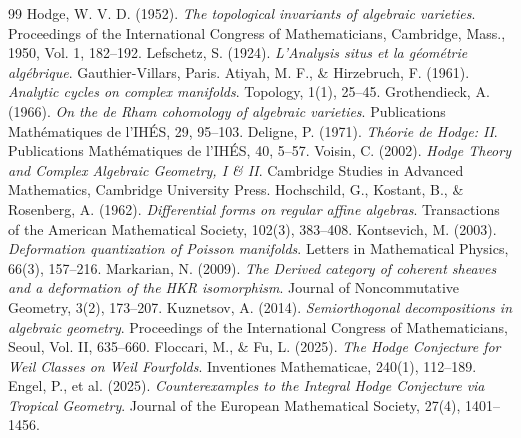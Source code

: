 \documentclass[11pt,a4paper]{article}
\theoremstyle{definition}
\begin{document}
\newpage
\begin{thebibliography}{99}
 Hodge, W. V. D. (1952). \textit{The topological invariants of algebraic varieties}. Proceedings of the International Congress of Mathematicians, Cambridge, Mass., 1950, Vol. 1, 182--192.
 Lefschetz, S. (1924). \textit{L'Analysis situs et la géométrie algébrique}. Gauthier-Villars, Paris.
 Atiyah, M. F., \& Hirzebruch, F. (1961). \textit{Analytic cycles on complex manifolds}. Topology, 1(1), 25--45.
 Grothendieck, A. (1966). \textit{On the de Rham cohomology of algebraic varieties}. Publications Mathématiques de l'IHÉS, 29, 95--103.
 Deligne, P. (1971). \textit{Théorie de Hodge: II}. Publications Mathématiques de l'IHÉS, 40, 5--57.
 Voisin, C. (2002). \textit{Hodge Theory and Complex Algebraic Geometry, I \& II}. Cambridge Studies in Advanced Mathematics, Cambridge University Press.
 Hochschild, G., Kostant, B., \& Rosenberg, A. (1962). \textit{Differential forms on regular affine algebras}. Transactions of the American Mathematical Society, 102(3), 383--408.
 Kontsevich, M. (2003). \textit{Deformation quantization of Poisson manifolds}. Letters in Mathematical Physics, 66(3), 157--216.
 Markarian, N. (2009). \textit{The Derived category of coherent sheaves and a deformation of the HKR isomorphism}. Journal of Noncommutative Geometry, 3(2), 173--207.
 Kuznetsov, A. (2014). \textit{Semiorthogonal decompositions in algebraic geometry}. Proceedings of the International Congress of Mathematicians, Seoul, Vol. II, 635--660.
 Floccari, M., \& Fu, L. (2025). \textit{The Hodge Conjecture for Weil Classes on Weil Fourfolds}. Inventiones Mathematicae, 240(1), 112--189.
 Engel, P., et al. (2025). \textit{Counterexamples to the Integral Hodge Conjecture via Tropical Geometry}. Journal of the European Mathematical Society, 27(4), 1401--1456.
\end{thebibliography}
\end{document}
